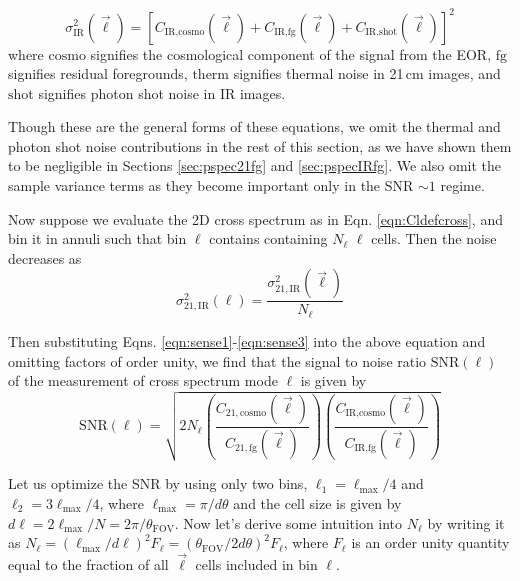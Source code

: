 \documentclass[preprint]{aastex}
\newcommand{\IR}{\text{IR}}
\newcommand{\therm}{\text{therm}}
\newcommand{\cosmo}{\text{cosmo}}
\newcommand{\fg}{\text{fg}}
\newcommand{\shot}{\text{shot}}
\newcommand{\SNR}{\text{SNR}}
\begin{document}
\begin{equation}
\label{eqn:sense3}
	\sigma_{\IR}^2(\vec{\ell})=[C_{\IR,\cosmo}(\vec{\ell})+C_{\IR,\fg}(\vec{\ell})+C_{\IR,\shot}(\vec{\ell})]^2
\end{equation}
where $\cosmo$ signifies the cosmological component of the signal from the EOR, $\fg$ signifies residual foregrounds, $\therm$ signifies thermal noise in 21\,cm images, and $\shot$ signifies photon shot noise in IR images. 


Though these are the general forms of these equations, we omit the thermal and photon shot noise contributions in the rest of this section, as we have shown them to be negligible in Sections \ref{sec:pspec21fg} and \ref{sec:pspecIRfg}. We also omit the sample variance terms as they become important only in the SNR $\sim1$ regime. 

Now suppose we evaluate the 2D cross spectrum as in Eqn. \ref{eqn:Cldefcross}, and bin it in annuli such that bin $\ell$ contains containing $N_\ell$ $\ell$ cells. Then the noise decreases as
\begin{equation}
	\sigma_{21,\IR}^2(\ell) = \frac{\sigma_{21,\IR}^2(\vec{\ell}) }{N_\ell}
\end{equation}

Then substituting Eqns. \ref{eqn:sense1}-\ref{eqn:sense3} into the above equation and omitting factors of order unity, we find that the signal to noise ratio $\SNR(\ell)$ of the measurement of cross spectrum mode $\ell$ is given by
\begin{equation}
	\SNR(\ell) = \sqrt{
		2N_\ell
	\left(\frac{C_{21,\cosmo}(\vec{\ell})  }{ C_{21,\fg}(\vec{\ell}) }\right)
	\left(\frac{C_{\IR,\cosmo}(\vec{\ell})  }{ C_{\IR,\fg}(\vec{\ell}) }\right)
	}
\end{equation}

Let us optimize the SNR by using only two bins, $\ell_1=\ell_\text{max}/4$ and $\ell_2=3\ell_\text{max}/4$, where $\ell_\text{max}=\pi/d\theta$ and the cell size is given by $d\ell=2\ell_\text{max}/N=2\pi/\theta_\text{FOV}$. Now let's derive some intuition into $N_\ell$ by writing it as $N_\ell=(\ell_\text{max}/d\ell)^2F_\ell=(\theta_\text{FOV}/2d\theta)^2F_\ell$, where $F_\ell$ is an order unity quantity equal to the fraction of all $\vec{\ell}$ cells included in bin $\ell$.

\end{document}
